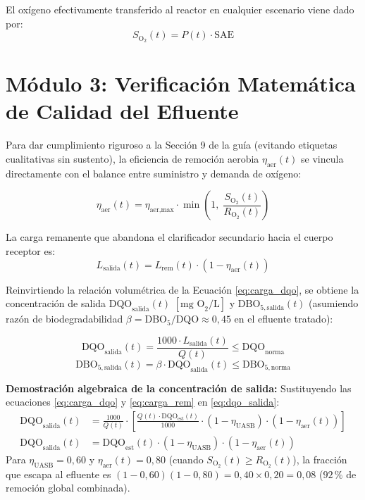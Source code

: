 \documentclass[11pt, a4paper]{article}
\begin{document}
El oxígeno efectivamente transferido al reactor en cualquier escenario viene dado por:
\begin{equation}
    S_{\text{O}_2}(t) = P(t) \cdot \text{SAE}
\end{equation}

\section{Módulo 3: Verificación Matemática de Calidad del Efluente}

Para dar cumplimiento riguroso a la Sección 9 de la guía (evitando etiquetas cualitativas sin sustento), la eficiencia de remoción aerobia $\eta_{\text{aer}}(t)$ se vincula directamente con el balance entre suministro y demanda de oxígeno:

\begin{equation}
    \eta_{\text{aer}}(t) = \eta_{\text{aer,max}} \cdot \min\left(1, \; \frac{S_{\text{O}_2}(t)}{R_{\text{O}_2}(t)}\right)
\end{equation}

La carga remanente que abandona el clarificador secundario hacia el cuerpo receptor es:
\begin{equation}
    L_{\text{salida}}(t) = L_{\text{rem}}(t) \cdot \left(1 - \eta_{\text{aer}}(t)\right)
\end{equation}

Reinvirtiendo la relación volumétrica de la Ecuación \eqref{eq:carga_dqo}, se obtiene la concentración de salida $\text{DQO}_{\text{salida}}(t)$ $\left[\text{mg O}_2/\text{L}\right]$ y $\text{DBO}_{5,\text{salida}}(t)$ (asumiendo razón de biodegradabilidad $\beta = \text{DBO}_5/\text{DQO} \approx 0{,}45$ en el efluente tratado):

\begin{equation}
    \text{DQO}_{\text{salida}}(t) = \frac{1000 \cdot L_{\text{salida}}(t)}{Q(t)} \le \text{DQO}_{\text{norma}}
    \label{eq:dqo_salida}
\end{equation}
\begin{equation}
    \text{DBO}_{5,\text{salida}}(t) = \beta \cdot \text{DQO}_{\text{salida}}(t) \le \text{DBO}_{5,\text{norma}}
\end{equation}

\textbf{Demostración algebraica de la concentración de salida:}
Sustituyendo las ecuaciones \eqref{eq:carga_dqo} y \eqref{eq:carga_rem} en \eqref{eq:dqo_salida}:
\begin{align}
    \text{DQO}_{\text{salida}}(t) &= \frac{1000}{Q(t)} \cdot \left[ \frac{Q(t) \cdot \text{DQO}_{\text{est}}(t)}{1000} \cdot (1 - \eta_{\text{UASB}}) \cdot (1 - \eta_{\text{aer}}(t)) \right] \nonumber \\
    \text{DQO}_{\text{salida}}(t) &= \text{DQO}_{\text{est}}(t) \cdot (1 - \eta_{\text{UASB}}) \cdot (1 - \eta_{\text{aer}}(t))
    \label{eq:demostracion_salida}
\end{align}
Para $\eta_{\text{UASB}} = 0{,}60$ y $\eta_{\text{aer}}(t) = 0{,}80$ (cuando $S_{\text{O}_2}(t) \ge R_{\text{O}_2}(t)$), la fracción que escapa al efluente es $(1 - 0{,}60)(1 - 0{,}80) = 0{,}40 \times 0{,}20 = 0{,}08$ ($92\,\%$ de remoción global combinada).
\end{document}
